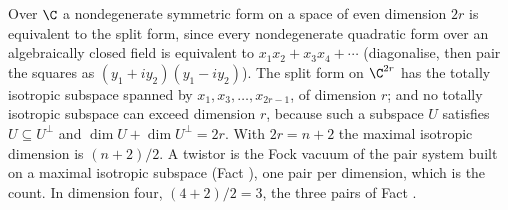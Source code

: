 Over $\C$ a nondegenerate symmetric form on a space of even dimension $2r$ is equivalent to the split form, since every nondegenerate quadratic form over an algebraically closed field is equivalent to $x_{1}x_{2} + x_{3}x_{4} + \cdots$ (diagonalise, then pair the squares as $(y_{1} + iy_{2})(y_{1} - iy_{2})$). The split form on $\C^{2r}$ has the totally isotropic subspace spanned by $x_{1}, x_{3}, \ldots, x_{2r-1}$, of dimension $r$; and no totally isotropic subspace can exceed dimension $r$, because such a subspace $U$ satisfies $U \subseteq U^{\perp}$ and $\dim U + \dim U^{\perp} = 2r$. With $2r = n + 2$ the maximal isotropic dimension is $(n+2)/2$. A twistor is the Fock vacuum of the pair system built on a maximal isotropic subspace (Fact ), one pair per dimension, which is the count. In dimension four, $(4+2)/2 = 3$, the three pairs of Fact .
